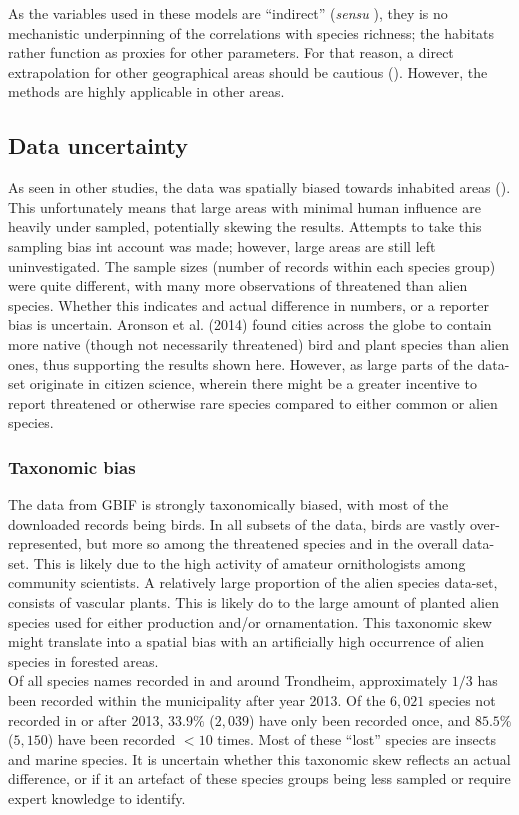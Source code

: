 \documentclass{article}
\begin{document}
 As the variables used in these models are ``indirect'' (\textit{sensu} \cite{Guisan2000}), they is no mechanistic underpinning of the correlations with species richness; the habitats rather function as proxies for other parameters. For that reason, a direct extrapolation for other geographical areas should be cautious (\cite{Guisan2000}). However, the methods are highly applicable in other areas.
   
\subsection{Data uncertainty}
As seen in other studies, %
the data was spatially biased towards inhabited areas (\cite{Graham2004}). This unfortunately means that large areas with minimal human influence are heavily under sampled, potentially skewing the results. Attempts to take this sampling bias int account was made; however, large areas are still left uninvestigated. The sample sizes (number of records within each species group) were quite different, with many more observations of threatened than alien species. Whether this indicates and actual difference in numbers, or a reporter bias is uncertain. Aronson et al. (2014) found cities across the globe to contain more native (though not necessarily threatened) bird and plant species than alien ones, thus supporting the results shown here.
However, as large parts of the data-set originate in citizen science, wherein there might be a greater incentive to report threatened or otherwise rare species compared to either common or alien species.\\ %

\subsubsection{Taxonomic bias}
The data from GBIF is strongly taxonomically biased, with most of the downloaded records being birds. In all subsets of the data, birds are vastly over-represented, but more so among the threatened species and in the overall data-set. This is likely due to the high activity of amateur ornithologists among community scientists.
A relatively large proportion of the alien species data-set, consists of vascular plants. This is likely do to the large amount of planted alien species used for either production and/or ornamentation. %
This taxonomic skew might translate into a spatial bias with an artificially high occurrence of alien species in forested areas.\\  %
Of all species names recorded in and around Trondheim, approximately $1/3$ has been recorded within the municipality after year 2013. Of the $6,021$ species not recorded in or after 2013, $33.9\%$ ($2,039$) have only been recorded once, and $85.5\%$ ($5,150$) have been recorded $<10$ times. Most of these ``lost'' species are insects and marine species. It is uncertain whether this taxonomic skew reflects an actual difference, or if it an artefact of these species groups being less sampled or require expert knowledge to identify.\\
\end{document}
